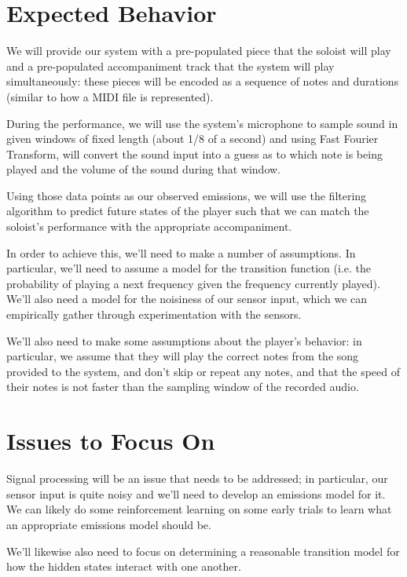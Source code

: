 \documentclass[11pt]{article}
\begin{document}
\section{Expected Behavior}

We will provide our system with a pre-populated piece that the soloist
will play and a pre-populated accompaniment track that the system
will play simultaneously: these pieces will be encoded as a sequence
of notes and durations (similar to how a MIDI file is represented).

During the performance, we will use the system's microphone to sample
sound in given windows of fixed length (about 1/8 of a second) and
using Fast Fourier Transform, will convert the sound input into 
a guess as to which note is being played and the volume of the sound
during that window.

Using those data points as our observed emissions, we will use
the filtering algorithm to predict future states of the player such
that we can match the soloist's performance with the appropriate
accompaniment.

In order to achieve this, we'll need to make a number of assumptions.
In particular, we'll need to assume a model for the transition
function (i.e. the probability of playing a next frequency given
the frequency currently played). We'll also need a model for the
noisiness of our sensor input, which we can empirically gather
through experimentation with the sensors.

We'll also need to make some assumptions about the player's behavior:
in particular, we assume that they will play the correct notes
from the song provided to the system, and don't skip or repeat
any notes, and that the speed of their notes is not faster than
the sampling window of the recorded audio.

\section{Issues to Focus On}

Signal processing will be an issue that needs to be addressed;
in particular, our sensor input is quite noisy and we'll need
to develop an emissions model for it. We can likely do some
reinforcement learning on some early trials to learn what an
appropriate emissions model should be.

We'll likewise also need to focus on determining a reasonable
transition model for how the hidden states interact with
one another.
\end{document}
